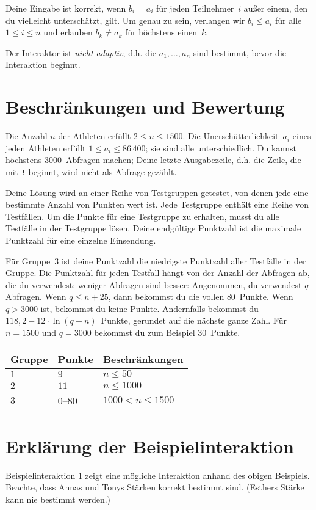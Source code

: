 Deine Eingabe ist korrekt, wenn $b_i=a_i$ für jeden Teilnehmer~$i$ außer einem, den du vielleicht unterschätzt, gilt.
Um genau zu sein, verlangen wir $b_i\leq a_i$ für alle $1\leq i\leq n$ und erlauben $b_k \neq a_k$ für höchstens einen~$k$.

Der Interaktor ist \emph{nicht adaptiv}, d.h. die $a_1,\ldots, a_n$ sind bestimmt, bevor die Interaktion beginnt.

\section*{Beschränkungen und Bewertung}

Die Anzahl $n$ der Athleten erfüllt 
$2\leq n\leq 1500$. %
Die Unerschütterlichkeit~$a_i$ eines jeden Athleten erfüllt 
$1\leq a_i\leq 86\,400$; %
sie sind alle unterschiedlich. %
Du kannst 
höchstens $3000$~Abfragen machen; %
Deine letzte Ausgabezeile, d.h. die Zeile, die mit \texttt{!} beginnt, wird nicht als Abfrage gezählt.

Deine Lösung wird an einer Reihe von Testgruppen getestet, von denen jede eine bestimmte Anzahl von Punkten wert ist.
Jede Testgruppe enthält eine Reihe von Testfällen.
Um die Punkte für eine Testgruppe zu erhalten, musst du alle Testfälle in der Testgruppe lösen.
Deine endgültige Punktzahl ist die maximale Punktzahl für eine einzelne Einsendung.

Für Gruppe~$3$ ist deine Punktzahl die niedrigste Punktzahl aller Testfälle in der Gruppe.
Die Punktzahl für jeden Testfall hängt von der Anzahl der Abfragen ab, die du verwendest;
weniger Abfragen sind besser:
Angenommen, du verwendest $q$ Abfragen. 
Wenn $q \le n+25$, dann bekommst du die vollen $80$~Punkte. 
Wenn $q > 3000$ ist, bekommst du keine Punkte.
Andernfalls bekommst du 
$118,2 - 12 \cdot \ln(q - n)$~Punkte, gerundet auf die nächste ganze Zahl. %
Für $n = 1500$ und $q = 3000$ bekommst du zum Beispiel $30$~Punkte.

\medskip
\begin{tabular}{lll}
Gruppe & Punkte & Beschränkungen\\\hline
$1$  &  $9$ & $n\leq 50$\\
$2$  &  $11$ & $n\leq 1000$\\
$3$  &  $0$--$80$ & $1000 < n\leq 1500$\\
\end{tabular}

\section*{Erklärung der Beispielinteraktion}

Beispielinteraktion $1$ zeigt eine mögliche Interaktion anhand des obigen Beispiels. 
Beachte, dass Annas und Tonys Stärken korrekt bestimmt sind.
(Esthers Stärke kann nie bestimmt werden.)
